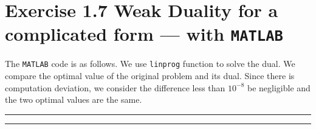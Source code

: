 \section{Exercise 1.7 Weak Duality for a complicated form --- with {\tt{MATLAB}}}

The { \tt{MATLAB}} code is as follows. We use {\tt{linprog}} function to solve the dual. We compare the optimal value of the original problem and its dual. Since there is computation deviation, we consider the difference less than $10^{-8}$ be negligible and the two optimal values are the same.

\bigskip

\hrule

\small

\normalsize

\hrule

\bigskip
